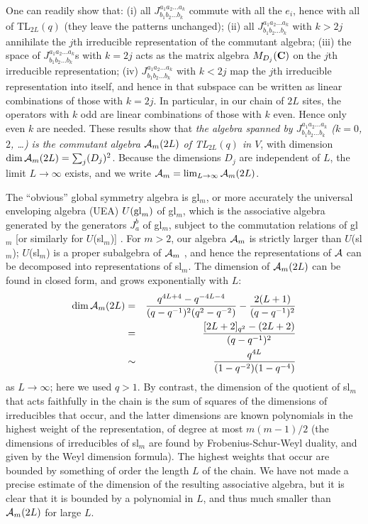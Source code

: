\documentclass[twocolumn,floats,pra]{revtex4}
\def \cA {{\cal A}}
\newcommand {\bea}{\begin{eqnarray}}
\newcommand {\eea} {\end{eqnarray}}
\begin{document}
One can readily show that: (i) all $J^{a_1a_2\ldots
a_k}_{b_1b_2\ldots b_k}$ commute with all the $e_i$, hence with
all of TL$_{2L}(q)$ (they leave the patterns unchanged); (ii) all
$J^{a_1a_2\ldots a_k}_{b_1b_2\ldots b_k}$ with $k>2j$ annihilate
the $j$th irreducible representation of the commutant algebra;
(iii) the space of $J^{a_1a_2\ldots a_k}_{b_1b_2\ldots b_k}$s with
$k=2j$ acts as the matrix algebra $M_{D_j}({\bf C})$ on the $j$th
irreducible representation; (iv) $J^{a_1a_2\ldots
a_k}_{b_1b_2\ldots b_k}$ with $k<2j$ map the $j$th irreducible
representation into itself, and hence in that subspace can be
written as linear combinations of those with $k=2j$. In
particular, in our chain of $2L$ sites, the operators with $k$ odd
are linear combinations of those with $k$ even. Hence only even
$k$ are needed. These results show that {\em the algebra spanned
by $J^{a_1a_2\ldots a_k}_{b_1b_2\ldots b_k}$ ($k=0$, $2$, \ldots)
is the commutant algebra $\cA_m(2L)$ of TL$_{2L}(q)$ in $V$}, with
dimension ${\rm dim\, }\cA_m(2L)=\sum_j (D_j)^2$. Because the
dimensions $D_j$ are independent of $L$, the limit $L\to\infty$
exists, and we write $\cA_m=\lim_{L\to\infty}\cA_m(2L)$.

The ``obvious'' global symmetry algebra is gl$_m$, or more
accurately the universal enveloping algebra (UEA) $U({\rm gl}_m)$
of gl$_m$, which is the associative algebra generated by the
generators $J_a^b$ of gl$_m$, subject to the commutation relations
of gl$_m$ [or similarly for $U$(sl$_m$)] \cite{cp,kass}. For
$m>2$, our algebra $\cA_m$ is strictly larger than $U$(sl$_m$);
$U$(sl$_m$) is a proper subalgebra of $\cA_m$ \cite{quotalg}, and
hence the representations of $\cA$ can be decomposed into
representations of sl$_m$. The dimension of $\cA_m(2L)$ can be
found in closed form, and grows exponentially with $L$:%
\bea%
{\rm dim}\,\cA_m(2L)&=&
\frac{q^{4L+4}-q^{-4L-4}}{(q-q^{-1})^2(q^2-q^{-2})}-
\frac{2(L+1)}{(q-q^{-1})^2}\\
&=&\frac{[2L+2]_{q^2}-(2L+2)}{(q-q^{-1})^2}\\
&\sim&\frac{q^{4L}}{(1-q^{-2})(1-q^{-4})}\eea%
as $L\to\infty$; here we used $q>1$. By contrast, the dimension of
the quotient of sl$_m$ that acts faithfully in the chain is the
sum of squares of the dimensions of irreducibles that occur, and
the latter dimensions are known polynomials in the highest weight
of the representation, of degree at most $m(m-1)/2$ (the
dimensions of irreducibles of sl$_m$ are found by
Frobenius-Schur-Weyl duality, and given by the Weyl dimension
formula). The highest weights that occur are bounded by something
of order the length $L$ of the chain. We have not made a precise
estimate of the dimension of the resulting associative algebra,
but it is clear that it is bounded by a polynomial in $L$, and
thus much smaller than $\cA_m(2L)$ for large $L$.
\end{document}
